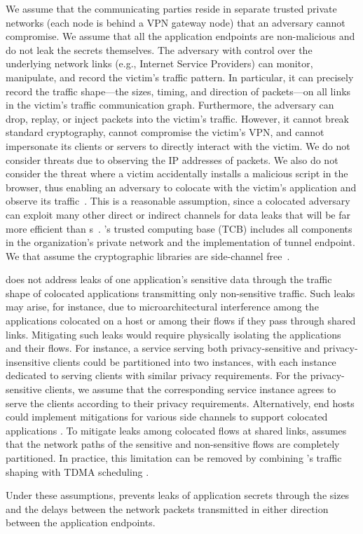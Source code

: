 We assume that the communicating parties reside in separate trusted private networks (\eg each node is behind a VPN gateway node) that an adversary cannot compromise.
We assume that all the application endpoints are non-malicious and do not leak the secrets themselves.
The adversary with control over the underlying network links (e.g., Internet Service Providers) can monitor, manipulate, and record the victim's traffic pattern.
In particular, it can precisely record the traffic shape---the sizes, timing, and direction of packets---on all links in the victim's traffic communication graph.
Furthermore, the adversary can drop, replay, or inject packets into the victim's traffic.
However, it cannot break standard cryptography, cannot compromise the victim's VPN, and cannot impersonate its clients or servers to directly interact with the victim.
We do not consider threats due to observing the IP addresses of packets.
We also do not consider the threat where a victim accidentally installs a malicious script in the browser, thus enabling an adversary to colocate with the
victim's application and observe its traffic~\cite{schuster2017beautyburst,mehta2022pacer}.
This is a reasonable assumption, since a colocated adversary can exploit many other direct or indirect channels for data leaks that will be far more efficient than {\nsc}s~\cite{kocher2018spectre, yarom2014flushreload, liu2015llcpractical, irazoqui2015ssa, vila2017loophole}.
{\sys}'s trusted computing base (TCB) includes all components in the organization's private network and the implementation of {\sys} tunnel endpoint.
We that assume the cryptographic libraries are side-channel free~\cite{almeida2016verifying}.

{\sys} does not address leaks of one application's sensitive data through the traffic shape of colocated applications transmitting only non-sensitive traffic.
Such leaks may arise, for instance, due to microarchitectural interference among the applications colocated on a host or among their flows if they pass through shared links.
Mitigating such leaks would require physically isolating the
applications and their flows.
For instance, a service serving both privacy-sensitive and privacy-insensitive clients could be partitioned into two instances, with each instance dedicated to serving clients with similar privacy requirements.
For the privacy-sensitive clients, we assume that the corresponding service instance agrees to serve the clients according to their privacy requirements. 
Alternatively, end hosts could implement mitigations for various side channels to support colocated applications \cite{mehta2022pacer, page05partitionedcache, shi2011limiting, kim2012stealthmem, varadarajan2014scheduler, braun2015robust}. 
To mitigate leaks among colocated flows at shared links, {\sys} assumes that the network paths of the sensitive and non-sensitive flows are completely partitioned.
In practice, this limitation can be removed by combining {\sys}’s traffic shaping with TDMA scheduling \cite{beams2021ifs, vattikonda2012tdma}.


Under these assumptions, {\sys} prevents leaks of application secrets through the sizes and the delays between the network packets transmitted in either direction between the application endpoints.

